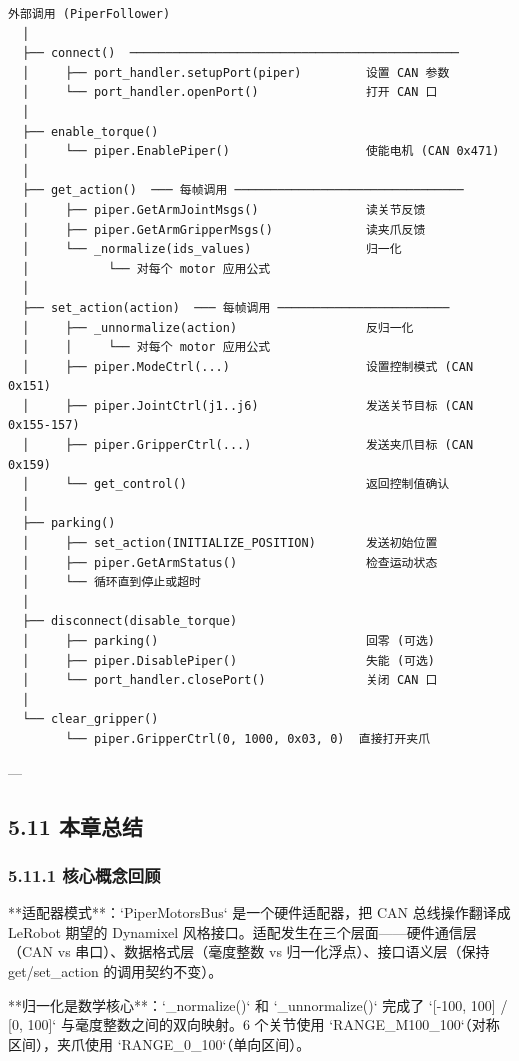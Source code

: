 \documentclass[UTF8,a4paper,11pt]{ctexart}
\begin{document}
{\begin{lstlisting}[language=text]
外部调用 (PiperFollower)
  │
  ├── connect()  ──────────────────────────────────────────────
  │     ├── port_handler.setupPort(piper)         设置 CAN 参数
  │     └── port_handler.openPort()               打开 CAN 口
  │
  ├── enable_torque()
  │     └── piper.EnablePiper()                   使能电机 (CAN 0x471)
  │
  ├── get_action()  ─── 每帧调用 ────────────────────────────────
  │     ├── piper.GetArmJointMsgs()               读关节反馈
  │     ├── piper.GetArmGripperMsgs()             读夹爪反馈
  │     └── _normalize(ids_values)                归一化
  │           └── 对每个 motor 应用公式
  │
  ├── set_action(action)  ─── 每帧调用 ────────────────────────
  │     ├── _unnormalize(action)                  反归一化
  │     │     └── 对每个 motor 应用公式
  │     ├── piper.ModeCtrl(...)                   设置控制模式 (CAN 0x151)
  │     ├── piper.JointCtrl(j1..j6)               发送关节目标 (CAN 0x155-157)
  │     ├── piper.GripperCtrl(...)                发送夹爪目标 (CAN 0x159)
  │     └── get_control()                         返回控制值确认
  │
  ├── parking()
  │     ├── set_action(INITIALIZE_POSITION)       发送初始位置
  │     ├── piper.GetArmStatus()                  检查运动状态
  │     └── 循环直到停止或超时
  │
  ├── disconnect(disable_torque)
  │     ├── parking()                             回零 (可选)
  │     ├── piper.DisablePiper()                  失能 (可选)
  │     └── port_handler.closePort()              关闭 CAN 口
  │
  └── clear_gripper()
        └── piper.GripperCtrl(0, 1000, 0x03, 0)  直接打开夹爪
\end{lstlisting}

---

\subsection{5.11 本章总结}

\subsubsection{5.11.1 核心概念回顾}

\item[1] **适配器模式**：`PiperMotorsBus` 是一个硬件适配器，把 CAN 总线操作翻译成 LeRobot 期望的 Dynamixel 风格接口。适配发生在三个层面——硬件通信层（CAN vs 串口）、数据格式层（毫度整数 vs 归一化浮点）、接口语义层（保持 get/set_action 的调用契约不变）。

\item[2] **归一化是数学核心**：`_normalize()` 和 `_unnormalize()` 完成了 `[-100, 100] / [0, 100]` 与毫度整数之间的双向映射。6 个关节使用 `RANGE_M100_100`（对称区间），夹爪使用 `RANGE_0_100`（单向区间）。

}
\end{document}
